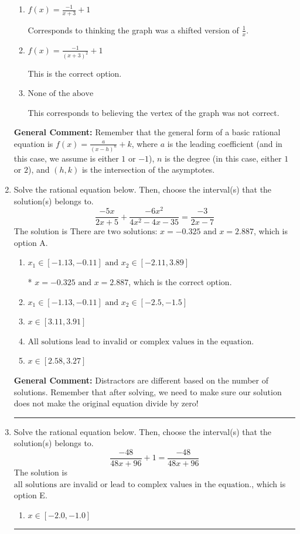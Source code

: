 \documentclass{extbook}[14pt]
\newcommand{\litem}[1]{\item #1

\rule{\textwidth}{0.4pt}}
\begin{document}
\begin{enumerate}
{\begin{enumerate}[label=\Alph*.]
Corresponds to thinking the graph was a shifted version of $\frac{1}{x}$, using the general form $f(x) = \frac{a}{(x+h)^2}+k$, and the opposite leading coefficient.
\item \( f(x) = \frac{-1}{x + 3} + 1 \)

Corresponds to thinking the graph was a shifted version of $\frac{1}{x}$.
\item \( f(x) = \frac{-1}{(x + 3)^2} + 1 \)

This is the correct option.
\item \( \text{None of the above} \)

This corresponds to believing the vertex of the graph was not correct.
\end{enumerate}

\textbf{General Comment:} Remember that the general form of a basic rational equation is $ f(x) = \frac{a}{(x-h)^n} + k$, where $a$ is the leading coefficient (and in this case, we assume is either $1$ or $-1$), $n$ is the degree (in this case, either $1$ or $2$), and $(h, k)$ is the intersection of the asymptotes.
}
\litem{
Solve the rational equation below. Then, choose the interval(s) that the solution(s) belongs to.
\[ \frac{-5x}{2x + 5} + \frac{-6x^{2}}{4x^{2} -4 x -35} = \frac{-3}{2x -7} \]
The solution is \( \text{There are two solutions: } x = -0.325 \text{ and } x = 2.887 \), which is option A.\begin{enumerate}[label=\Alph*.]
\item \( x_1 \in [-1.13, -0.11] \text{ and } x_2 \in [-2.11,3.89] \)

* $x = -0.325 \text{ and } x = 2.887$, which is the correct option.
\item \( x_1 \in [-1.13, -0.11] \text{ and } x_2 \in [-2.5,-1.5] \)


\item \( x \in [3.11,3.91] \)


\item \( \text{All solutions lead to invalid or complex values in the equation.} \)


\item \( x \in [2.58,3.27] \)


\end{enumerate}

\textbf{General Comment:} Distractors are different based on the number of solutions. Remember that after solving, we need to make sure our solution does not make the original equation divide by zero!
}
\litem{
Solve the rational equation below. Then, choose the interval(s) that the solution(s) belongs to.
\[ \frac{-48}{48x + 96} + 1 = \frac{-48}{48x + 96} \]
The solution is \( \text{all solutions are invalid or lead to complex values in the equation.} \), which is option E.\begin{enumerate}[label=\Alph*.]
\item \( x \in [-2.0,-1.0] \)


\end{enumerate}}
\end{enumerate}
\end{document}
